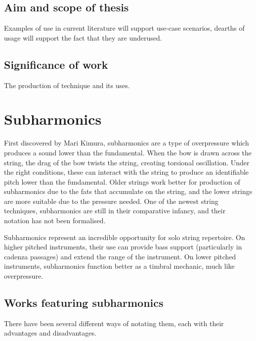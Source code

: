 \subsection{Aim and scope of thesis}
Examples of use in current literature will support use-case scenarios, dearths of usage will support the fact that they are underused.

\subsection{Significance of work}
The production of technique and its uses.

\section{Subharmonics}
First discovered by Mari Kimura, subharmonics are a type of overpressure which produces a sound lower than the fundamental.\autocite{kimuraHowProduceSubharmonics1999} 
When the bow is drawn across the string, the drag of the bow twists the string, creating torsional oscillation. 
Under the right conditions, these can interact with the string to produce an identifiable pitch lower than the fundamental.\autocite{Subharmonics2006} 
Older strings work better for production of subharmonics due to the fats that accumulate on the string, and the lower strings are more suitable due to the pressure needed.\autocite{kimuraHowProduceSubharmonics1999}
One of the newest string techniques, subharmonics are still in their comparative infancy, and their notation has not been formalised. 

Subharmonics represent an incredible opportunity for solo string repertoire. 
On higher pitched instruments, their use can provide bass support (particularly in cadenza passages) and extend the range of the instrument. 
On lower pitched instruments, subharmonics function better as a timbral mechanic, much like overpressure. 


\subsection{Works featuring subharmonics}

There have been several different ways of notating them, each with their advantages and disadvantages.



